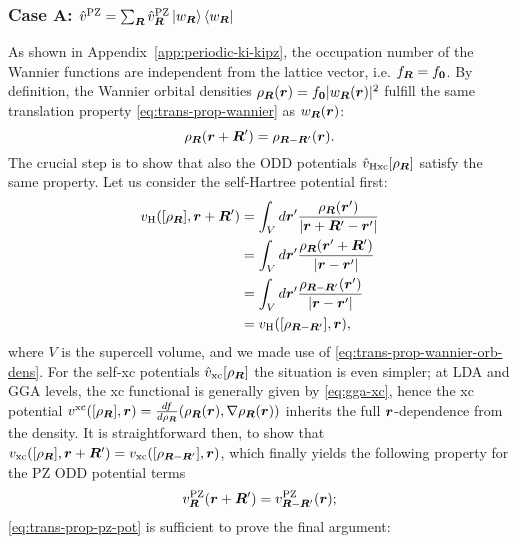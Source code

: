 \subsubsection*{Case A: $\hat{v}^{\rm PZ} = \sum_{{\bm R}} \hat{v}^{\rm PZ}_{{\bm R}} \ket{w_{{\bm R}}} \bra{w_{{\bm R}}}$}
As shown in Appendix~\ref{app:periodic-ki-kipz}, the occupation number of the Wannier functions are independent from the lattice vector, i.e. $f_{{\bm R}} = f_{\bm 0}$. By definition, the Wannier orbital densities $\rho_{{\bm R}}({\bm r}) = f_{\bm 0} |w_{{\bm R}}({\bm r})|^2$ fulfill the same translation property \eqref{eq:trans-prop-wannier} as $w_{{\bm R}}({\bm r})$:
%
\begin{equation}
    \rho_{{\bm R}}({\bm r} + {\bm R}') = \rho_{{\bm R} - {\bm R}'}({\bm r}) .
    \label{eq:trans-prop-wannier-orb-dens}
\end{equation}
%
The crucial step is to show that also the ODD potentials $\hat{v}_{\rm Hxc}[\rho_{{\bm R}}]$ satisfy the same property. Let us consider the self-Hartree potential first:
%
\begin{equation}
    \begin{split}
        v_{\rm H}([\rho_{{\bm R}}],{\bm r} + {\bm R}') & = \int_V d{\bm r}' \frac{\rho_{{\bm R}}({\bm r}')}{|{\bm r} + {\bm R}' - {\bm r}'|} \\ 
        & = \int_V d{\bm r}' \frac{\rho_{{\bm R}}({\bm r}' + {\bm R}')}{|{\bm r} - {\bm r}'|} \\
        & = \int_V d{\bm r}' \frac{\rho_{{\bm R} - {\bm R}'}({\bm r}')}{|{\bm r} - {\bm r}'|} \\
        & = v_{\rm H}([\rho_{{\bm R} - {\bm R}'}],{\bm r}) ,
    \end{split}
    \label{eq:trans-prop-hartree-pot}
\end{equation}
%
where $V$ is the supercell volume, and we made use of \cref{eq:trans-prop-wannier-orb-dens}. For the self-xc potentials $\hat{v}_{\rm xc}[\rho_{{\bm R}}]$ the situation is even simpler; at LDA and GGA levels, the xc functional is generally given by \cref{eq:gga-xc}, hence the xc potential $v^{\rm xc}([\rho_{{\bm R}}],{\bm r}) = \frac{df}{d\rho_{{\bm R}}}(\rho_{{\bm R}}({\bm r}), \nabla\rho_{{\bm R}}({\bm r}))$ inherits the full ${\bm r}$-dependence from the density. It is straightforward then, to show that $v_{\rm xc}([\rho_{{\bm R}}],{\bm r} + {\bm R}') = v_{\rm xc}([\rho_{{\bm R} - {\bm R}'}],{\bm r})$, which finally yields the following property for the PZ ODD potential terms
%
\begin{equation}
    v^{\rm PZ}_{{\bm R}}({\bm r} + {\bm R}') = v^{\rm PZ}_{{\bm R} - {\bm R}'}({\bm r}) ;
    \label{eq:trans-prop-pz-pot}
\end{equation}
%
\cref{eq:trans-prop-pz-pot} is sufficient to prove the final argument:
%
